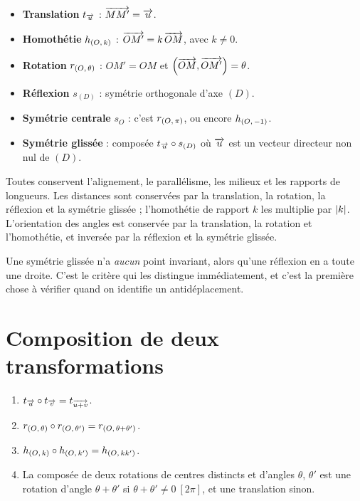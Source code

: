 \begin{definition}
\begin{itemize}[leftmargin=*, itemsep=0.15em]
  \item \textbf{Translation} $t_{\overrightarrow{u}}$ : $\overrightarrow{MM'} = \overrightarrow{u}$.
  \item \textbf{Homothétie} $h_{(O,\,k)}$ : $\overrightarrow{OM'} = k\,\overrightarrow{OM}$, avec
        $k \neq 0$.
  \item \textbf{Rotation} $r_{(O,\,\theta)}$ : $OM' = OM$ et
        $\left(\overrightarrow{OM},\overrightarrow{OM'}\right) = \theta$.
  \item \textbf{Réflexion} $s_{(D)}$ : symétrie orthogonale d'axe $(D)$.
  \item \textbf{Symétrie centrale} $s_{O}$ : c'est $r_{(O,\,\pi)}$, ou encore
        $h_{(O,\,-1)}$.
  \item \textbf{Symétrie glissée} : composée
        $t_{\overrightarrow{u}} \circ s_{(D)}$ où $\overrightarrow{u}$ est un vecteur directeur non nul
        de $(D)$.
\end{itemize}
\end{definition}

\begin{propriete}
Toutes conservent l'alignement, le parallélisme, les milieux et les rapports
de longueurs. Les distances sont conservées par la translation, la rotation,
la réflexion et la symétrie glissée ; l'homothétie de rapport $k$ les
multiplie par $\left|k\right|$. L'orientation des angles est conservée par la
translation, la rotation et l'homothétie, et inversée par la réflexion et la
symétrie glissée.
\end{propriete}

\begin{avertissement}
Une symétrie glissée n'a \emph{aucun} point invariant, alors qu'une réflexion
en a toute une droite. C'est le critère qui les distingue immédiatement, et
c'est la première chose à vérifier quand on identifie un antidéplacement.
\end{avertissement}

\section{Composition de deux transformations}

\begin{propriete}
\begin{enumerate}[label=\textbf{\arabic*.}, leftmargin=*, itemsep=0.15em]
  \item $t_{\overrightarrow{u}} \circ t_{\overrightarrow{v}} = t_{\overrightarrow{u+v}}$.
  \item $r_{(O,\,\theta)} \circ r_{(O,\,\theta')} = r_{(O,\,\theta+\theta')}$.
  \item $h_{(O,\,k)} \circ h_{(O,\,k')} = h_{(O,\,kk')}$.
  \item La composée de deux rotations de centres distincts et d'angles
        $\theta$, $\theta'$ est une rotation d'angle $\theta+\theta'$ si
        $\theta+\theta' \neq 0 \ [2\pi]$, et une translation sinon.
\end{enumerate}
\end{propriete}

